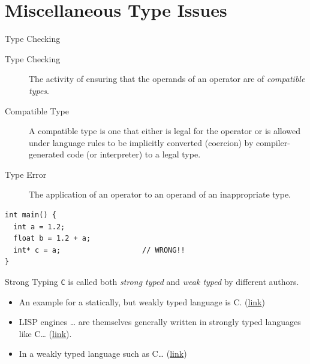 \documentclass[presentation]{beamer}
\begin{document}
\section{Miscellaneous Type Issues}
\label{sec:orgheadline66}

\begin{frame}[fragile,label={sec:orgheadline59}]{Type Checking}
 \begin{description}
\item[{Type Checking}] The activity of ensuring that the operands of an
operator are of \emph{compatible types}.
\item[{Compatible Type}] A compatible type is one that either is legal
for the operator or is allowed under language rules to be
implicitly converted (coercion) by compiler-generated code (or
interpreter) to a legal type.
\item[{Type Error}] The application of an operator to an operand of an
inappropriate type.
\end{description}


\begin{verbatim}
int main() {
  int a = 1.2;
  float b = 1.2 + a;
  int* c = a;                   // WRONG!!
}
\end{verbatim}
\end{frame}

\begin{frame}[fragile,label={sec:orgheadline60}]{Strong Typing}
 \texttt{C} is called both \emph{strong typed} and \emph{weak typed} by different
authors.

\begin{itemize}
\item An example for a statically, but weakly typed language is C. (\href{http://compilers.iecc.com/comparch/article/95-10-071}{link})
\item LISP engines \ldots{} are themselves generally written in strongly
typed languages like C\ldots{} (\href{http://lists.tlug.jp/ML/0010/msg00352.html}{link}).
\item In a weakly typed language such as C\ldots{} (\href{http://www-plan.cs.colorado.edu/diwan/5535-99/hw-6-soln.html}{link})
\end{itemize}
\end{frame}
\end{document}

